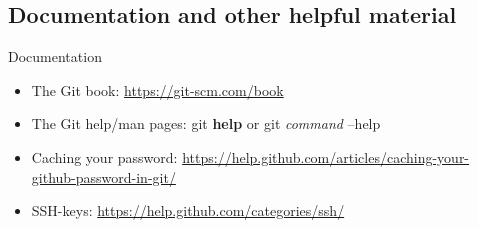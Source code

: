 \documentclass{beamer}
\begin{document}
\subsection{Documentation and other helpful material}
\begin{frame}{Documentation}
  \begin{itemize}
    \item The Git book: \url{https://git-scm.com/book}
    \item The Git help/man pages: git \textbf{help} or git \emph{command} --help
    \item Caching your password: \url{https://help.github.com/articles/caching-your-github-password-in-git/}
    \item SSH-keys: \url{https://help.github.com/categories/ssh/} 
  \end{itemize}
\end{frame}
\end{document}
